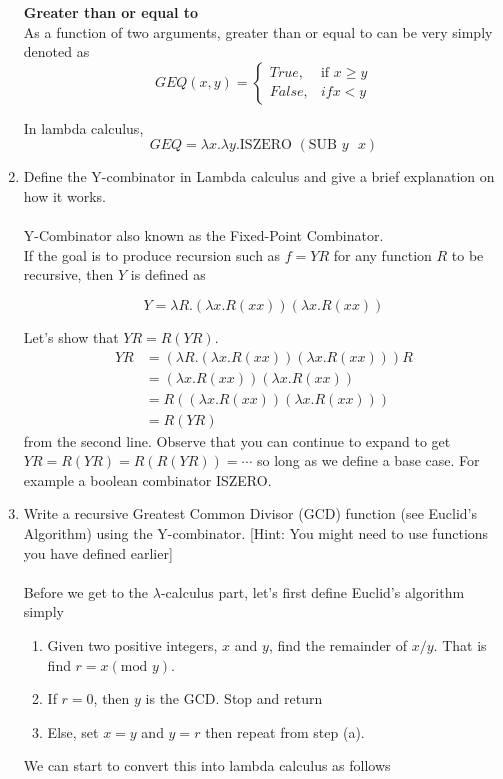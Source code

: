 \documentclass{article}
\begin{document}
\begin{enumerate}
    \bigskip
    \Large \textbf{Greater than or equal to}\\
    \normalsize
    As a function of two arguments, greater than or equal to can be very simply denoted as
    \[GEQ(x,y) = \begin{cases} True, & \text{if } x\geq y \\ False, &{if } x < y\end{cases}\]

    In lambda calculus,
    \[GEQ = \lambda x.\lambda y.\text{ISZERO }(\text{SUB } y \text{ } x)\]
    
    \color{black}
    
    \item Define the Y-combinator in Lambda calculus and give a brief explanation on how it works.\\
    \\
    \color{blue}
    Y-Combinator also known as the Fixed-Point Combinator.
    \\
    If the goal is to produce recursion such as \(f=YR\) for any function \(R\) to be recursive, then \(Y\) is defined as

    \[Y=\lambda R.(\lambda x.R(xx))(\lambda x.R(xx))\]

    Let's show that \(YR = R(YR)\).
    \begin{align}
        YR &= (\lambda R.(\lambda x.R(xx))(\lambda x.R(xx)))R \\
           &= (\lambda x.R(xx))(\lambda x.R(xx)) \\
           &= R((\lambda x.R(xx))(\lambda x.R(xx))) \\
           &= R(YR)
    \end{align}
    from the second line. Observe that you can continue to expand to get \(YR = R(YR) = R(R(YR)) = \cdots\) so long as we define a base case. For example a boolean combinator ISZERO.\\
    
    \color{black}
    \newpage
    \item Write a recursive Greatest Common Divisor (GCD) function (see Euclid's Algorithm) using the Y-combinator. [Hint: You might need to use functions you have defined earlier]\\
    \\
    \color{blue}
    Before we get to the \(\lambda\)-calculus part, let's first define Euclid's algorithm simply
    \begin{enumerate}
        \item Given two positive integers, \(x\) and \(y\), find the remainder of \(x / y\). That is find \(r = x (\text{mod }y)\).
        \item If \(r = 0\), then \(y\) is the GCD. Stop and return
        \item Else, set \(x = y\) and \(y = r\) then repeat from step (a).
    \end{enumerate}
    We can start to convert this into lambda calculus as follows


\end{enumerate}
\end{document}
